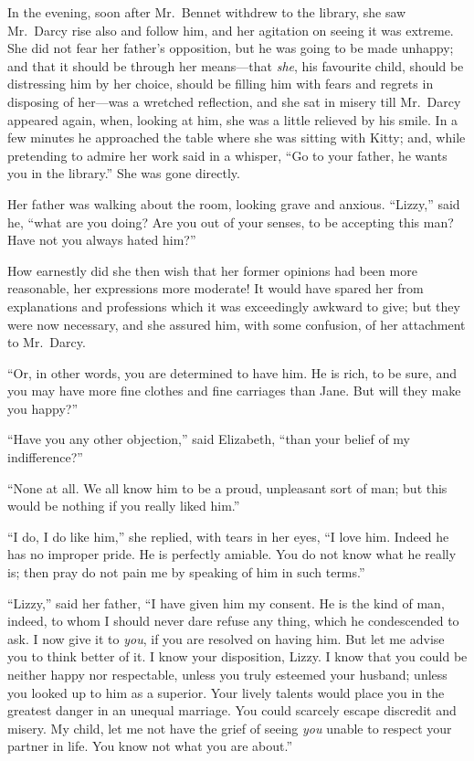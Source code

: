 \documentclass[12pt,english]{book}
\begin{document}
\bigskip{} In the evening, soon after Mr.\ Bennet withdrew to the
library, she saw Mr.\ Darcy rise also and follow him, and her agitation
on seeing it was extreme. She did not fear her father's opposition,
but he was going to be made unhappy; and that it should be through
her means\mbox{---}that \textit{she}, his favourite child, should
be distressing him by her choice, should be filling him with fears
and regrets in disposing of her\mbox{---}was a wretched reflection,
and she sat in misery till Mr.\ Darcy appeared again, when, looking
at him, she was a little relieved by his smile. In a few minutes he
approached the table where she was sitting with Kitty; and, while
pretending to admire her work said in a whisper, {}``Go to your father,
he wants you in the library.'' She was gone directly.

Her father was walking about the room, looking grave and anxious.
{}``Lizzy,'' said he, {}``what are you doing? Are you out of your
senses, to be accepting this man? Have not you always hated him?''\


How earnestly did she then wish that her former opinions had been
more reasonable, her expressions more moderate! It would have spared
her from explanations and professions which it was exceedingly awkward
to give; but they were now necessary, and she assured him, with some
confusion, of her attachment to Mr.\ Darcy.

{}``Or, in other words, you are determined to have him. He is rich,
to be sure, and you may have more fine clothes and fine carriages
than Jane. But will they make you happy?''\


{}``Have you any other objection,'' said Elizabeth, {}``than your
belief of my indifference?''\


{}``None at all. We all know him to be a proud, unpleasant sort of
man; but this would be nothing if you really liked him.''

{}``I do, I do like him,'' she replied, with tears in her eyes,
{}``I love him. Indeed he has no improper pride. He is perfectly
amiable. You do not know what he really is; then pray do not pain
me by speaking of him in such terms.''

{}``Lizzy,'' said her father, {}``I have given him my consent.
He is the kind of man, indeed, to whom I should never dare refuse
any thing, which he condescended to ask. I now give it to \textit{you},
if you are resolved on having him. But let me advise you to think
better of it. I know your disposition, Lizzy. I know that you could
be neither happy nor respectable, unless you truly esteemed your husband;
unless you looked up to him as a superior. Your lively talents would
place you in the greatest danger in an unequal marriage. You could
scarcely escape discredit and misery. My child, let me not have the
grief of seeing \textit{you} unable to respect your partner in life.
You know not what you are about.''
\end{document}
